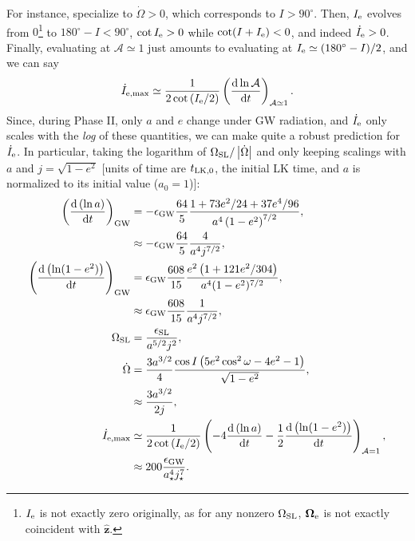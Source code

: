 \documentclass[11pt,
        usenames, %
        dvipsnames %
    ]{article}
\newcommand*{\rd}[2]{\frac{\mathrm{d}#1}{\mathrm{d}#2}}
\newcommand*{\bm}[1]{\boldsymbol{\mathbf{#1}}}
\newcommand*{\uv}[1]{\hat{\bm{#1}}}
\newcommand*{\abs}[1]{\left|#1\right|}
\newcommand*{\p}[1]{\left(#1\right)}
\begin{document}
For instance, specialize to $\dot{\Omega} > 0$, which corresponds to $I >
90^\circ$. Then, $I_{\rm e}$ evolves from $0$\footnote{$I_{\rm e}$ is not
exactly zero originally, as for any nonzero $\Omega_{\rm SL}$, $\bm{\Omega}_{\rm
e}$ is not exactly coincident with $\uv{z}$.} to $180^\circ - I < 90^\circ$,
$\cot I_{\rm e} > 0$ while $\cot (I + I_{\rm e}) < 0$, and indeed $\dot{I}_{\rm
e} > 0$. Finally, evaluating at $\mathcal{A} \simeq 1$ just amounts to
evaluating at $I_{\rm e} \simeq (180^\circ - I) / 2$, and we can say
\begin{equation}
    \dot{I}_{\rm e, \max} \simeq \frac{1}{2 \cot \p{I_{\rm e} / 2}}
        \p{\rd{\ln \mathcal{A}}{t}}_{\mathcal{A} \simeq 1}.
\end{equation}
Since, during Phase II, only $a$ and $e$ change under GW radiation, and
$\dot{I}_{\rm e}$ only scales with the \emph{log} of these quantities, we can
make quite a robust prediction for $\dot{I}_{\rm e}$. In particular, taking the
logarithm of $\Omega_{\rm SL} / \abs{\dot{\Omega}}$ and only keeping scalings
with $a$ and $j = \sqrt{1 - e^2}$ [units of time are $t_{\rm LK, 0}$, the
initial LK time, and $a$ is normalized to its initial value ($a_0 = 1$)]:
\begin{align}
    \p{\rd{\p{\ln a}}{t}}_{\rm GW} &= -\epsilon_{\rm GW}
        \frac{64}{5}\frac{1 + 73e^2/24 + 37e^4/96}{a^4\p{1 - e^2}^{7/2}},\\
        &\approx -\epsilon_{\rm GW} \frac{64}{5}\frac{4}{a^4j^{7/2}},\\
    \p{\rd{\p{\ln (1 - e^2)}}{t}}_{\rm GW}
        &= \epsilon_{\rm GW}\frac{608}{15} \frac{e^2\p{1 + 121e^2/304}}{
            a^4(1 - e^2)^{7/2}},\\
        &\approx \epsilon_{\rm GW}\frac{608}{15}\frac{1}{a^4j^{7/2}},\\
    \Omega_{\rm SL} &= \frac{\epsilon_{\rm SL}}{a^{5/2}j^2},\\
    \dot{\Omega} &= \frac{3a^{3/2}}{4}\frac{\cos I\p{5e^2 \cos^2\omega
            - 4e^2 - 1}}{\sqrt{1 - e^2}},\\
        &\approx \frac{3a^{3/2}}{2j},\\
    \dot{I}_{\rm e, \max} &\simeq \frac{1}{2\cot \p{I_{\rm e} / 2}}
            \p{-4\rd{\p{\ln a}}{t} - \frac{1}{2}\rd{\p{\ln (1 - e^2)}}{t}}_{
            \mathcal{A} = 1},\\
        &\approx 200\frac{\epsilon_{\rm GW}}{a_\star^4j_\star^7}.
\end{align}
\end{document}
